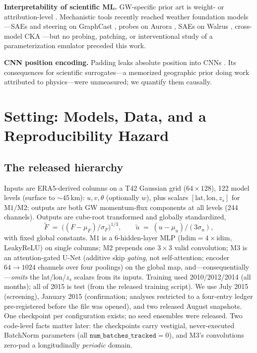 \documentclass[10pt,twocolumn]{article}
\newcommand{\Mone}{\mathrm{M1}}
\newcommand{\Mtwo}{\mathrm{M2}}
\newcommand{\Mthree}{\mathrm{M3}}
\begin{document}
\textbf{Interpretability of scientific ML.} GW-specific prior art is weight- or attribution-level \citep{pahlavan2024,pahlavan2025,haslauer2026}. Mechanistic tools recently reached weather foundation models---SAEs and steering on GraphCast \citep{macmillan2025}, probes on Aurora \citep{richards2025}, SAEs on Walrus \citep{rosenfeld2026}, cross-model CKA \citep{craig2026}---but no probing, patching, or interventional study of a parameterization emulator preceded this work.

\textbf{CNN position encoding.} Padding leaks absolute position into CNNs \citep{islam2020,kayhan2020}. Its consequences for scientific surrogates---a memorized geographic prior doing work attributed to physics---were unmeasured; we quantify them causally.

\section{Setting: Models, Data, and a Reproducibility Hazard}\label{sec:setting}

\subsection{The released hierarchy}\label{sec:models}
Inputs are ERA5-derived columns on a T42 Gaussian grid ($64\times128$), 122 model levels (surface to ${\sim}45$\,km): $u,v,\theta$ (optionally $w$), plus scalars $[\mathrm{lat},\mathrm{lon},z_s]$ for $\Mone/\Mtwo$; outputs are both GW momentum-flux components at all levels (244 channels). Outputs are cube-root transformed and globally standardized,
\begin{equation}\label{eq:norm}
\tilde F \;=\; \big((F-\mu_F)/\sigma_F\big)^{1/3},\qquad
\tilde u \;=\; (u-\mu_u)/(3\sigma_u),
\end{equation}
with fixed global constants. $\Mone$ is a 6-hidden-layer MLP ($\mathrm{hdim}=4\times\mathrm{idim}$, LeakyReLU) on single columns; $\Mtwo$ prepends one $3{\times}3$ valid convolution; $\Mthree$ is an attention-gated U-Net (additive skip \emph{gating}, not self-attention; encoder $64\!\to\!1024$ channels over four poolings) on the global map, and---consequentially---\emph{omits} the lat/lon/$z_s$ scalars from its inputs. Training used 2010/2012/2014 (all months); all of 2015 is test (from the released training script). We use July 2015 (screening), January 2015 (confirmation; analyses restricted to a four-entry ledger pre-registered before the file was opened), and two released August snapshots. One checkpoint per configuration exists; no seed ensembles were released. Two code-level facts matter later: the checkpoints carry vestigial, never-executed BatchNorm parameters (all $\texttt{num\_batches\_tracked}=0$), and $\Mthree$'s convolutions zero-pad a longitudinally \emph{periodic} domain.
\end{document}
